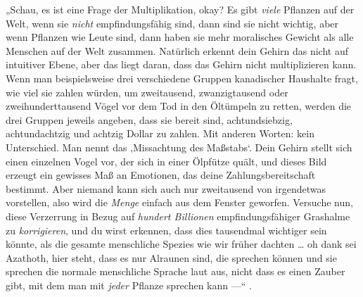 „Schau, es ist eine Frage der Multiplikation, okay? Es gibt \emph{viele} Pflanzen auf der Welt, wenn sie \emph{nicht} empfindungsfähig sind, dann sind sie nicht wichtig, aber wenn Pflanzen wie Leute sind, dann haben sie mehr moralisches Gewicht als alle Menschen auf der Welt zusammen. Natürlich erkennt dein Gehirn das nicht auf intuitiver Ebene, aber das liegt daran, dass das Gehirn nicht multiplizieren kann. Wenn man beispielsweise drei verschiedene Gruppen kanadischer Haushalte fragt, wie viel sie zahlen würden, um zweitausend, zwanzigtausend oder zweihunderttausend Vögel vor dem Tod in den Öltümpeln zu retten, werden die drei Gruppen jeweils angeben, dass sie bereit sind, achtundsiebzig, achtundachtzig und achtzig Dollar zu zahlen. Mit anderen Worten: kein Unterschied. Man nennt das ‚Missachtung des Maßstabs‘. Dein Gehirn stellt sich einen einzelnen Vogel vor, der sich in einer Ölpfütze quält, und dieses Bild erzeugt ein gewisses Maß an Emotionen, das deine Zahlungsbereitschaft bestimmt. Aber niemand kann sich auch nur zweitausend von irgendetwas vorstellen, also wird die \emph{Menge} einfach aus dem Fenster geworfen. Versuche nun, diese Verzerrung in Bezug auf \emph{hundert Billionen} empfindungsfähiger Grashalme zu \emph{korrigieren}, und du wirst erkennen, dass dies tausendmal wichtiger sein könnte, als die gesamte menschliche Spezies wie wir früher dachten … oh dank sei Azathoth, hier steht, dass es nur Alraunen sind, die sprechen können und sie sprechen die normale menschliche Sprache laut aus, nicht dass es einen Zauber gibt, mit dem man mit \emph{jeder} Pflanze sprechen kann —“ .

